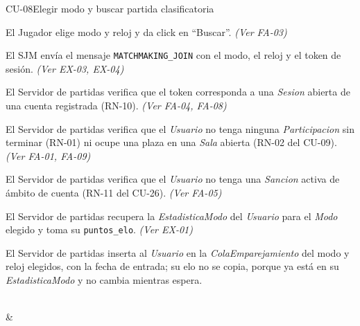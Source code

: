 \begin{fichacu}{CU-08}{Elegir modo y buscar partida clasificatoria}
{\begin{cuenum}[start=1]
      \item El Jugador elige modo y reloj y da click en ``Buscar''. \textit{(Ver \mbox{FA-03})}
      \item El SJM envía el mensaje \texttt{MATCHMAKING\_\allowbreak{}JOIN} con el modo, el reloj y el token de sesión. \textit{(Ver \mbox{EX-03}, \mbox{EX-04})}
      \item El Servidor de partidas verifica que el token corresponda a una \textit{Sesion} abierta de una cuenta registrada (\mbox{RN-10}). \textit{(Ver \mbox{FA-04}, \mbox{FA-08})}
      \item El Servidor de partidas verifica que el \textit{Usuario} no tenga ninguna \textit{Participacion} sin terminar (\mbox{RN-01}) ni ocupe una plaza en una \textit{Sala} abierta (\mbox{RN-02} del \mbox{CU-09}). \textit{(Ver \mbox{FA-01}, \mbox{FA-09})}
      \item El Servidor de partidas verifica que el \textit{Usuario} no tenga una \textit{Sancion} activa de ámbito de cuenta (\mbox{RN-11} del \mbox{CU-26}). \textit{(Ver \mbox{FA-05})}
      \item El Servidor de partidas recupera la \textit{EstadisticaModo} del \textit{Usuario} para el \textit{Modo} elegido y toma su \texttt{puntos\_\allowbreak{}elo}. \textit{(Ver \mbox{EX-01})}
      \item El Servidor de partidas inserta al \textit{Usuario} en la \textit{ColaEmparejamiento} del modo y reloj elegidos, con la fecha de entrada; su elo no se copia, porque ya está en su \textit{EstadisticaModo} y no cambia mientras espera.
    \end{cuenum}} \\
   & 
\end{fichacu}
